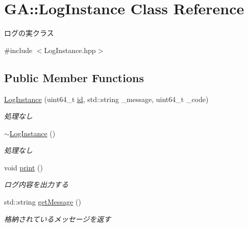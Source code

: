 \hypertarget{class_g_a_1_1_log_instance}{}\section{GA\+::Log\+Instance Class Reference}
\label{class_g_a_1_1_log_instance}


ログの実クラス  




{\ttfamily \#include $<$Log\+Instance.\+hpp$>$}

\subsection*{Public Member Functions}
\begin{DoxyCompactItemize}
\item 
\mbox{\label{class_g_a_1_1_log_instance_a47b744ad10f04e4048e6e6e9e90ed390}} 
\mbox{\hyperlink{class_g_a_1_1_log_instance_a47b744ad10f04e4048e6e6e9e90ed390}{Log\+Instance}} (uint64\+\_\+t \mbox{\hyperlink{class_g_a_1_1_log_instance_a2d330b3d354f7b0b0f6f755687180e24}{id}}, std\+::string \+\_\+message, uint64\+\_\+t \+\_\+code)
\begin{DoxyCompactList}\small\item\em 処理なし \end{DoxyCompactList}\item 
\mbox{\label{class_g_a_1_1_log_instance_a5707450df6603a16da30154bf0092d73}} 
\mbox{\hyperlink{class_g_a_1_1_log_instance_a5707450df6603a16da30154bf0092d73}{$\sim$\+Log\+Instance}} ()
\begin{DoxyCompactList}\small\item\em 処理なし \end{DoxyCompactList}\item 
void \mbox{\hyperlink{class_g_a_1_1_log_instance_abee57f65eb6587f097172a2410a8eb37}{print}} ()
\begin{DoxyCompactList}\small\item\em ログ内容を出力する \end{DoxyCompactList}\item 
\mbox{\label{class_g_a_1_1_log_instance_a4da709e1f67e6113cb2ec25ce3512107}} 
std\+::string \mbox{\hyperlink{class_g_a_1_1_log_instance_a4da709e1f67e6113cb2ec25ce3512107}{get\+Message}} ()
\begin{DoxyCompactList}\small\item\em 格納されているメッセージを返す \end{DoxyCompactList}\item 

\end{DoxyCompactItemize}
